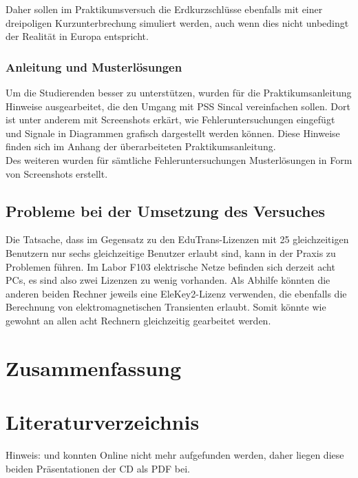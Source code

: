 \documentclass{scrartcl}
\begin{document}
\begin{onehalfspace}
Daher sollen im Praktikumsversuch die Erdkurzschlüsse ebenfalls mit einer dreipoligen Kurzunterbrechung simuliert werden, auch wenn dies nicht unbedingt der Realität in Europa entspricht.


\subsubsection{Anleitung und Musterlösungen}
Um die Studierenden besser zu unterstützen, wurden für die Praktikumsanleitung Hinweise ausgearbeitet, die den Umgang mit PSS Sincal vereinfachen sollen. Dort ist unter anderem mit Screenshots erkärt, wie Fehleruntersuchungen eingefügt und Signale in Diagrammen grafisch dargestellt werden können. Diese Hinweise finden sich im Anhang der überarbeiteten Praktikumsanleitung.\\
Des weiteren wurden für sämtliche Fehleruntersuchungen Musterlösungen in Form von Screenshots erstellt.

\subsection{Probleme bei der Umsetzung des Versuches}
Die Tatsache, dass im Gegensatz zu den EduTrans-Lizenzen mit 25 gleichzeitigen Benutzern nur sechs gleichzeitige Benutzer erlaubt sind, kann in der Praxis zu Problemen führen. Im Labor F103 \glqq elektrische Netze\grqq{} befinden sich derzeit acht PCs, es sind also zwei Lizenzen zu wenig vorhanden. Als Abhilfe könnten die anderen beiden Rechner jeweils eine EleKey2-Lizenz verwenden, die ebenfalls die Berechnung von elektromagnetischen Transienten erlaubt. Somit könnte wie gewohnt an allen acht Rechnern gleichzeitig gearbeitet werden.

\section{Zusammenfassung}

\newpage
{}
\setcounter{page}{1}
\section{Literaturverzeichnis}
Hinweis: \cite{hybrid-ltg} und \cite{phasenschieber-biblis} konnten Online nicht mehr aufgefunden werden, daher liegen diese beiden Präsentationen der CD als PDF bei.






\end{onehalfspace}
\end{document}
